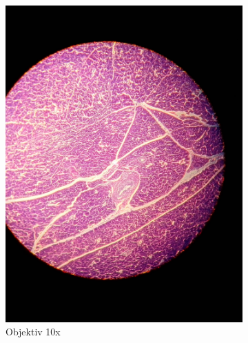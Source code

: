 \begin{figure}[h!]
	\centering
	\begin{subfigure}[b]{0.45\textwidth}
		\includegraphics[angle=270, width=1\textwidth]{../images/01_pankreas.jpg}
		\caption{Objektiv 10x}
		\label{fig:01_pankreas}
	\end{subfigure}
	\begin{subfigure}[b]{0.45\textwidth}

\end{subfigure}
\end{figure}
